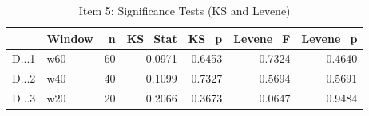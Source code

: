 \begin{table}

\caption{\label{tab:export_latex_tables}Item 5: Significance Tests (KS and Levene)}
\centering
\begin{tabular}[t]{llrrrrr}
\toprule
  & Window & n & KS\_Stat & KS\_p & Levene\_F & Levene\_p\\
\midrule
D...1 & w60 & 60 & 0.0971 & 0.6453 & 0.7324 & 0.4640\\
D...2 & w40 & 40 & 0.1099 & 0.7327 & 0.5694 & 0.5691\\
D...3 & w20 & 20 & 0.2066 & 0.3673 & 0.0647 & 0.9484\\
\bottomrule
\end{tabular}
\end{table}
